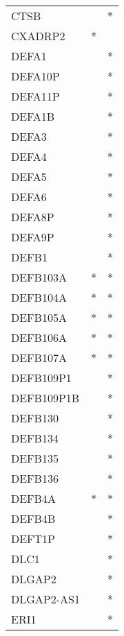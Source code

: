 \begin{longtable}{lcc}
CTSB         &                &          * \\
CXADRP2      &              * &            \\
DEFA1        &                &          * \\
DEFA10P      &                &          * \\
DEFA11P      &                &          * \\
DEFA1B       &                &          * \\
DEFA3        &                &          * \\
DEFA4        &                &          * \\
DEFA5        &                &          * \\
DEFA6        &                &          * \\
DEFA8P       &                &          * \\
DEFA9P       &                &          * \\
DEFB1        &                &          * \\
DEFB103A     &              * &          * \\
DEFB104A     &              * &          * \\
DEFB105A     &              * &          * \\
DEFB106A     &              * &          * \\
DEFB107A     &              * &          * \\
DEFB109P1    &                &          * \\
DEFB109P1B   &                &          * \\
DEFB130      &                &          * \\
DEFB134      &                &          * \\
DEFB135      &                &          * \\
DEFB136      &                &          * \\
DEFB4A       &              * &          * \\
DEFB4B       &                &          * \\
DEFT1P       &                &          * \\
DLC1         &                &          * \\
DLGAP2       &                &          * \\
DLGAP2-AS1   &                &          * \\
ERI1         &                &          * \\

\end{longtable}
